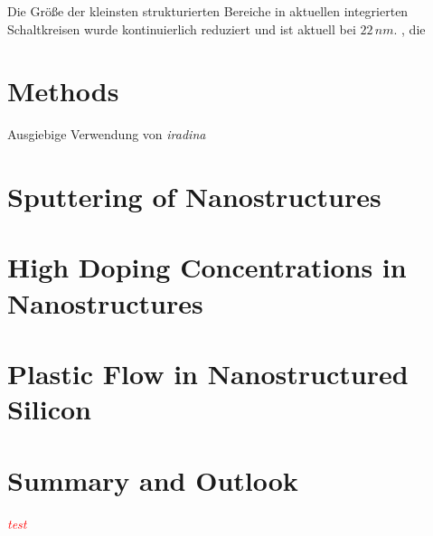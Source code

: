 \documentclass[11pt,
paper=a4,				
DIV=calc,		  %
headinclude,
]{scrbook}
\newcommand{\TODO}[1]{{\LARGE{\textcolor{red}{\emph {#1 }}}}}
\begin{document}
Die Größe der kleinsten strukturierten Bereiche in aktuellen integrierten Schaltkreisen wurde kontinuierlich reduziert und ist aktuell bei $22\,nm$.  , die 

\chapter{Methods}

Ausgiebige Verwendung von \emph{iradina} \cite{borschel_ion_2011}

\chapter{Sputtering of Nanostructures}

\chapter{High Doping Concentrations in Nanostructures}

\chapter{Plastic Flow in Nanostructured Silicon}

\chapter{Summary and Outlook}


\TODO{test}



\end{document}
